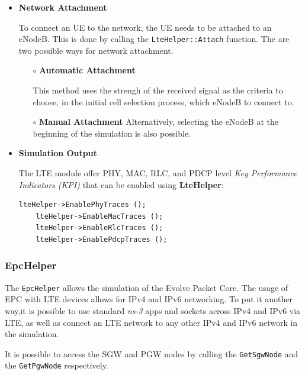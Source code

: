 \begin{itemize}
  \item \textbf{Network Attachment}
  
  To connect an UE to the network, the UE needs to be attached to an eNodeB. This is done by calling the
  \texttt{LteHelper::Attach} function. The are two possible ways for network attachment.

  \begin{itemize}
    \item[$\circ$] \textbf{Automatic Attachment}

    This method uses the strengh of the received signal as the criteria to choose, 
    in the initial cell selection process, which eNodeB to connect to.
    
    \item[$\circ$] \textbf{Manual Attachment}
    Alternatively, selecting the eNodeB at the beginning of the simulation is also possible.

  \end{itemize}

  \item \textbf{Simulation Output}
  
  The LTE module offer PHY, MAC, RLC, and PDCP level \textit{Key Performance Indicators (KPI)}
  that can be enabled using \textbf{LteHelper}:

  \begin{lstlisting}[language=myC++,caption={Enable LTE trace outputs}, captionpos=b]
    lteHelper->EnablePhyTraces ();
    lteHelper->EnableMacTraces ();
    lteHelper->EnableRlcTraces ();
    lteHelper->EnablePdcpTraces ();
  \end{lstlisting}
\end{itemize}

\subsubsection{EpcHelper}
The \texttt{EpcHelper} allows the simulation of the Evolve Packet Core. The usage of EPC with 
LTE devices allows for IPv4 and IPv6 networking. To put it another way,it is possible to use 
standard \textit{ns-3} apps and sockets across IPv4 and IPv6 via LTE, as well as connect an LTE network 
to any other IPv4 and IPv6 network in the simulation.

It is possible to access the SGW and PGW nodes by calling the \texttt{GetSgwNode} and the 
\texttt{GetPgwNode} respectively.

